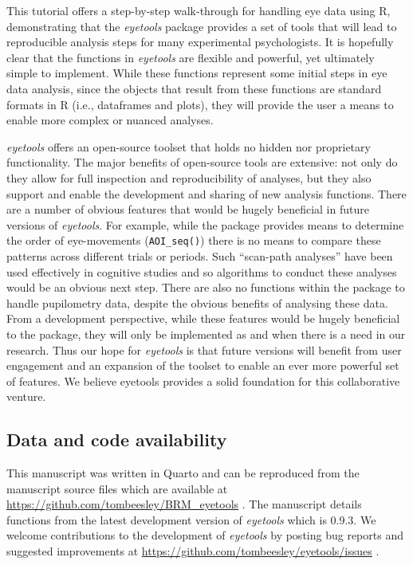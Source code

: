 \documentclass[
  man,
  floatsintext,
  longtable,
  nolmodern,
  notxfonts,
  notimes,
  colorlinks=true,linkcolor=blue,citecolor=blue,urlcolor=blue]{apa7}
\begin{document}
This tutorial offers a step-by-step walk-through for handling eye data
using R, demonstrating that the \emph{eyetools} package provides a set
of tools that will lead to reproducible analysis steps for many
experimental psychologists. It is hopefully clear that the functions in
\emph{eyetools} are flexible and powerful, yet ultimately simple to
implement. While these functions represent some initial steps in eye
data analysis, since the objects that result from these functions are
standard formats in R (i.e., dataframes and plots), they will provide
the user a means to enable more complex or nuanced analyses.

\emph{eyetools} offers an open-source toolset that holds no hidden nor
proprietary functionality. The major benefits of open-source tools are
extensive: not only do they allow for full inspection and
reproducibility of analyses, but they also support and enable the
development and sharing of new analysis functions. There are a number of
obvious features that would be hugely beneficial in future versions of
\emph{eyetools}. For example, while the package provides means to
determine the order of eye-movements (\texttt{AOI\_seq()}) there is no
means to compare these patterns across different trials or periods. Such
``scan-path analyses'' have been used effectively in cognitive studies
and so algorithms to conduct these analyses would be an obvious next
step. There are also no functions within the package to handle
pupilometry data, despite the obvious benefits of analysing these data.
From a development perspective, while these features would be hugely
beneficial to the package, they will only be implemented as and when
there is a need in our research. Thus our hope for \emph{eyetools} is
that future versions will benefit from user engagement and an expansion
of the toolset to enable an ever more powerful set of features. We
believe eyetools provides a solid foundation for this collaborative
venture.

\subsection{Data and code
availability}\label{data-and-code-availability}

This manuscript was written in Quarto and can be reproduced from the
manuscript source files which are available at
\url{https://github.com/tombeesley/BRM_eyetools} . The manuscript
details functions from the latest development version of \emph{eyetools}
which is 0.9.3. We welcome contributions to the development of
\emph{eyetools} by posting bug reports and suggested improvements at
\url{https://github.com/tombeesley/eyetools/issues} .
\end{document}
